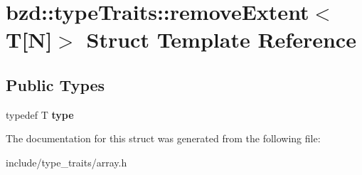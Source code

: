 \hypertarget{structbzd_1_1typeTraits_1_1removeExtent_3_01T[N]_4}{}\section{bzd\+:\+:type\+Traits\+:\+:remove\+Extent$<$ T\mbox{[}N\mbox{]}$>$ Struct Template Reference}
\label{structbzd_1_1typeTraits_1_1removeExtent_3_01T[N]_4}
\subsection*{Public Types}
\begin{DoxyCompactItemize}
\item 
\mbox{\label{structbzd_1_1typeTraits_1_1removeExtent_3_01T[N]_4_a5550949a97e5570534d479543a790989}} 
typedef T {\bfseries type}
\end{DoxyCompactItemize}


The documentation for this struct was generated from the following file\+:\begin{DoxyCompactItemize}
\item 
include/type\+\_\+traits/array.\+h\end{DoxyCompactItemize}
